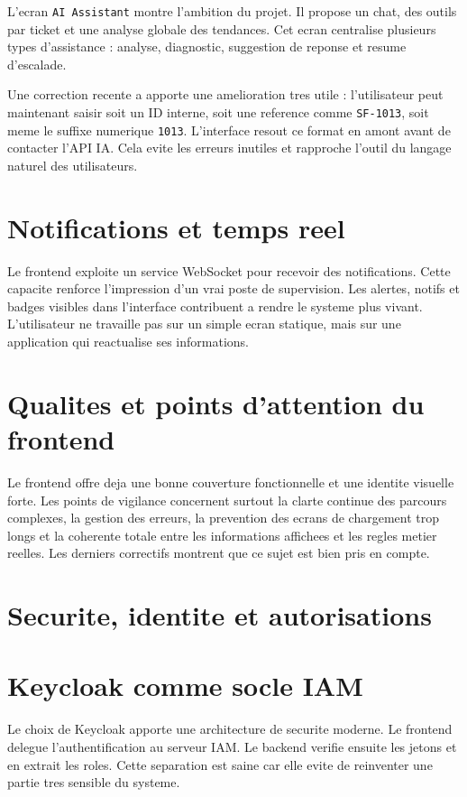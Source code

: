 L'ecran \texttt{AI Assistant} montre l'ambition du projet. Il propose un chat, des outils par ticket et une analyse globale des tendances. Cet ecran centralise plusieurs types d'assistance : analyse, diagnostic, suggestion de reponse et resume d'escalade.

Une correction recente a apporte une amelioration tres utile : l'utilisateur peut maintenant saisir soit un ID interne, soit une reference comme \texttt{SF-1013}, soit meme le suffixe numerique \texttt{1013}. L'interface resout ce format en amont avant de contacter l'API IA. Cela evite les erreurs inutiles et rapproche l'outil du langage naturel des utilisateurs.

\section{Notifications et temps reel}

Le frontend exploite un service WebSocket pour recevoir des notifications. Cette capacite renforce l'impression d'un vrai poste de supervision. Les alertes, notifs et badges visibles dans l'interface contribuent a rendre le systeme plus vivant. L'utilisateur ne travaille pas sur un simple ecran statique, mais sur une application qui reactualise ses informations.

\section{Qualites et points d'attention du frontend}

Le frontend offre deja une bonne couverture fonctionnelle et une identite visuelle forte. Les points de vigilance concernent surtout la clarte continue des parcours complexes, la gestion des erreurs, la prevention des ecrans de chargement trop longs et la coherente totale entre les informations affichees et les regles metier reelles. Les derniers correctifs montrent que ce sujet est bien pris en compte.



\section{Securite, identite et autorisations}

\section{Keycloak comme socle IAM}

Le choix de Keycloak apporte une architecture de securite moderne. Le frontend delegue l'authentification au serveur IAM. Le backend verifie ensuite les jetons et en extrait les roles. Cette separation est saine car elle evite de reinventer une partie tres sensible du systeme.

